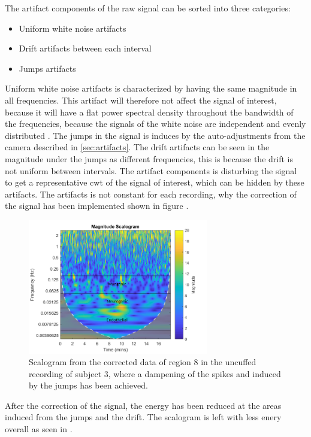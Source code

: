 The artifact components of the raw signal can be sorted into three categories: 
\begin{itemize}
	\item Uniform white noise artifacts
    \item Drift artifacts between each interval
	\item Jumps artifacts
\end{itemize}

Uniform white noise artifacts is characterized by having the same magnitude in all frequencies. This artifact will therefore not affect the signal of interest, because it will have a flat power spectral density throughout the bandwidth of the frequencies, because the signals of the white noise are independent and evenly distributed \cite{hida2014}. 
The jumps in the signal is induces by the auto-adjustments from the camera described in \ref{sec:artifacts}. The drift artifacts can be seen in the magnitude under the jumps as different frequencies, this is because the drift is not uniform between intervals.
The artifact components is disturbing the signal to get a representative cwt of the signal of interest, which can be hidden by these artifacts. The artifacts is not constant for each recording, why the correction of the signal has been implemented shown in figure .

\begin{figure}[H]
	\includegraphics[width=0.7\textwidth]{figures/uncuffed_sub3_roi8_corr}
	\caption{Scalogram from the corrected data of region 8 in the uncuffed recording of subject 3, where a dampening of the spikes and  induced by the jumps has been achieved.}
	\label{fig:scalogram_corr}
\end{figure} 

After the correction of the signal, the energy  has been reduced at the areas induced from the jumps and the drift. The scalogram is left with less enery overall as seen in . %

